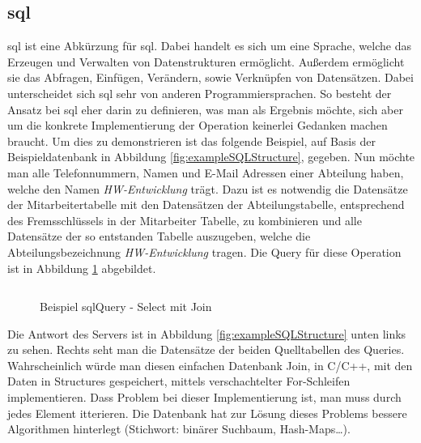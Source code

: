 \subsection{\acs{sql}}\label{subsec:sql}
\acs{sql} ist eine Abkürzung für \acl{sql}. Dabei handelt es sich um eine Sprache, 
welche das Erzeugen und Verwalten von Datenstrukturen ermöglicht. 
Außerdem ermöglicht sie das Abfragen, Einfügen, Verändern, sowie Verknüpfen von Datensätzen.
Dabei unterscheidet sich \ac{sql} sehr von anderen Programmiersprachen.
So besteht der Ansatz bei \ac{sql} eher darin zu definieren, was man als Ergebnis möchte, 
sich aber um die konkrete Implementierung der Operation keinerlei Gedanken machen braucht.
Um dies zu demonstrieren ist das folgende Beispiel, auf Basis der Beispieldatenbank in Abbildung \ref{fig:exampleSQLStructure}, gegeben.
Nun möchte man alle Telefonnummern, Namen und E-Mail Adressen einer Abteilung haben, welche den Namen \emph{HW-Entwicklung} trägt.
Dazu ist es notwendig die Datensätze der Mitarbeitertabelle mit den Datensätzen der Abteilungstabelle, 
entsprechend des Fremsschlüssels in der Mitarbeiter Tabelle, zu kombinieren und alle Datensätze der so entstanden Tabelle auszugeben, 
welche die Abteilungsbezeichnung \emph{HW-Entwicklung} tragen. 
Die Query für diese Operation ist in Abbildung \ref{fig:exampleSQLQuery} abgebildet.
\begin{figure}[hbt]
  \inputminted{sql}{content/hauptteil/theoretischeGrundlagen/rec/sqlQuery.sql}
  \caption{Beispiel sqlQuery - Select mit Join}
  \label{fig:exampleSQLQuery}
\end{figure}
Die Antwort des Servers ist in Abbildung \ref{fig:exampleSQLStructure} unten links zu sehen.
Rechts seht man die Datensätze der beiden Quelltabellen des Queries.
Wahrscheinlich würde man diesen einfachen Datenbank Join, in C/C++, mit den Daten in Structures gespeichert, mittels verschachtelter For-Schleifen implementieren. Dass Problem bei dieser Implementierung ist, man muss durch jedes Element itterieren.
Die Datenbank hat zur Lösung dieses Problems bessere Algorithmen hinterlegt (Stichwort: binärer Suchbaum, Hash-Maps\dots).

